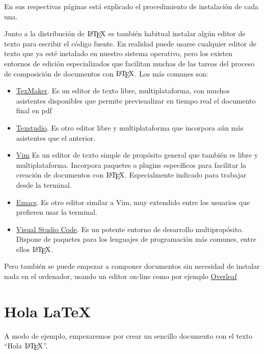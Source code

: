 \documentclass[
  a4paper,
]{scrreport}
\providecommand{\tightlist}{%
  \setlength{\itemsep}{0pt}\setlength{\parskip}{0pt}}\usepackage{longtable,booktabs,array}
\begin{document}
En sus respectivas páginas está explicado el procedimiento de
instalación de cada una.

Junto a la distribución de \(\text{\LaTeX}\) es también habitual
instalar algún editor de texto para escribir el código fuente. En
realidad puede usarse cualquier editor de texto que ya esté instalado en
nuestro sistema operativo, pero los existen entornos de edición
especializados que facilitan muchas de las tareas del proceso de
composición de documentos con \(\text{\LaTeX}\). Los más comunes son:

\begin{itemize}
\tightlist
\item
  \href{http://www.xm1math.net/texmaker/}{TexMaker}. Es un editor de
  texto libre, multiplataforma, con muchos asistentes disponibles que
  permite previsualizar en tiempo real el documento final en pdf
\item
  \href{http://www.texstudio.org/}{Texstudio}. Es otro editor libre y
  multiplataforma que incorpora aún más asistentes que el anterior.
\item
  \href{https://www.vim.org/}{Vim} Es un editor de texto simple de
  propósito general que también es libre y multiplataforma. Incorpora
  paquetes o plugins específicos para facilitar la creación de
  documentos con \(\text{\LaTeX}\). Especialmente indicado para trabajar
  desde la terminal.
\item
  \href{https://www.gnu.org/software/emacs/}{Emacs}. Es otro editor
  similar a Vim, muy extendido entre los usuarios que prefieren usar la
  terminal.
\item
  \href{https://code.visualstudio.com/}{Visual Studio Code}. Es un
  potente entorno de desarrollo multipropósito. Dispone de paquetes para
  los lenguajes de programación más comunes, entre ellos
  \(\text{\LaTeX}\).
\end{itemize}

Pero también se puede empezar a componer documentos sin necesidad de
instalar nada en el ordenador, usando un editor on-line como por ejemplo
\href{https://www.overleaf.com/}{Overleaf}

\hypertarget{hola-latex}{%
\section{Hola LaTeX}\label{hola-latex}}

A modo de ejemplo, empezaremos por crear un sencillo documento con el
texto ``Hola \(\text{\LaTeX}\)''.
\end{document}
